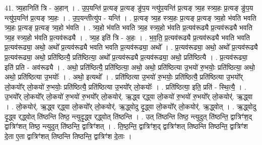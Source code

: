 \documentclass[17pt]{extarticle}
\begin{document}
41. त्र्य॒हानिति॑ त्रि - अ॒हान् । . उ॒प॒यन्ति॑ प्र॒त्यङ् प्र॒त्यङ् ङु॑प॒य न्त्यु॑प॒यन्ति॑ प्र॒त्यङ् त्र्य॒ह स्त्र्य॒हः प्र॒त्यङ्
ङु॑प॒य न्त्यु॑प॒यन्ति॑ प्र॒त्यङ् त्र्य॒हः । . उ॒प॒यन्तीत्यु॑प - यन्ति॑ । . प्र॒त्यङ् त्र्य॒ह स्त्र्य॒हः प्र॒त्यङ् प्र॒त्यङ् त्र्य॒हो भ॑वति भवति त्र्य॒हः प्र॒त्यङ् प्र॒त्यङ् त्र्य॒हो भ॑वति । . त्र्य॒हो भ॑वति भवति त्र्य॒ह स्त्र्य॒हो भ॑वति प्र॒त्यव॑रूढ्यै प्र॒त्यव॑रूढ्यै भवति त्र्य॒ह स्त्र्य॒हो भ॑वति प्र॒त्यव॑रूढ्यै । . त्र्य॒ह इति॑ त्रि - अ॒हः । . भ॒व॒ति॒ प्र॒त्यव॑रूढ्यै प्र॒त्यव॑रूढ्यै भवति भवति प्र॒त्यव॑रूढ्या॒ अथो॒ अथो᳚ प्र॒त्यव॑रूढ्यै भवति भवति प्र॒त्यव॑रूढ्या॒ अथो᳚ । . प्र॒त्यव॑रूढ्या॒ अथो॒ अथो᳚ प्र॒त्यव॑रूढ्यै प्र॒त्यव॑रूढ्या॒ अथो॒ प्रति॑ष्ठित्यै॒ प्रति॑ष्ठित्या॒ अथो᳚ प्र॒त्यव॑रूढ्यै प्र॒त्यव॑रूढ्या॒ अथो॒ प्रति॑ष्ठित्यै । . प्र॒त्यव॑रूढ्या॒ इति॑ प्रति - अव॑रूढ्यै । . अथो॒ प्रति॑ष्ठित्यै॒ प्रति॑ष्ठित्या॒ अथो॒ अथो॒ प्रति॑ष्ठित्या उ॒भयो॑ रु॒भयोः॒ प्रति॑ष्ठित्या॒ अथो॒ अथो॒ प्रति॑ष्ठित्या उ॒भयोः᳚ । . अथो॒ इत्यथो᳚ । . प्रति॑ष्ठित्या उ॒भयो॑ रु॒भयोः॒ प्रति॑ष्ठित्यै॒ प्रति॑ष्ठित्या उ॒भयो᳚र् लो॒कयो᳚र् लो॒कयो॑ रु॒भयोः॒ प्रति॑ष्ठित्यै॒ प्रति॑ष्ठित्या उ॒भयो᳚र् लो॒कयोः᳚ । . प्रति॑ष्ठित्या॒ इति॒ प्रति॑ - स्थि॒त्यै॒ । . उ॒भयो᳚र् लो॒कयो᳚र् लो॒कयो॑ रु॒भयो॑ रु॒भयो᳚र् लो॒कयोर्॑. ऋ॒द्ध्व र्‌द्ध्वा लो॒कयो॑ रु॒भयो॑ रु॒भयो᳚र् लो॒कयोर्॑. ऋ॒द्ध्वा । . लो॒कयोर्॑. ऋ॒द्ध्व र्‌द्ध्वा लो॒कयो᳚र् लो॒कयोर्॑. ऋ॒द्ध्वोदु दृ॒द्ध्वा लो॒कयो᳚र् लो॒कयोर्॑. ऋ॒द्ध्वोत् । . ऋ॒द्ध्वोदु दृ॒द्ध्व र्‌द्ध्वोत् ति॑ष्ठन्ति तिष्ठ॒ न्त्युदृ॒द्ध्व र्‌द्ध्वोत् ति॑ष्ठन्ति । . उत् ति॑ष्ठन्ति तिष्ठ॒ न्त्युदुत् ति॑ष्ठन्ति॒ द्वात्रिꣳ॑श॒द् द्वात्रिꣳ॑शत् तिष्ठ॒ न्त्युदुत् ति॑ष्ठन्ति॒ द्वात्रिꣳ॑शत् । . ति॒ष्ठ॒न्ति॒ द्वात्रिꣳ॑श॒द् द्वात्रिꣳ॑शत् तिष्ठन्ति तिष्ठन्ति॒ द्वात्रिꣳ॑श दे॒ता ए॒ता द्वात्रिꣳ॑शत् तिष्ठन्ति तिष्ठन्ति॒ द्वात्रिꣳ॑श दे॒ताः । \newline
\end{document}
